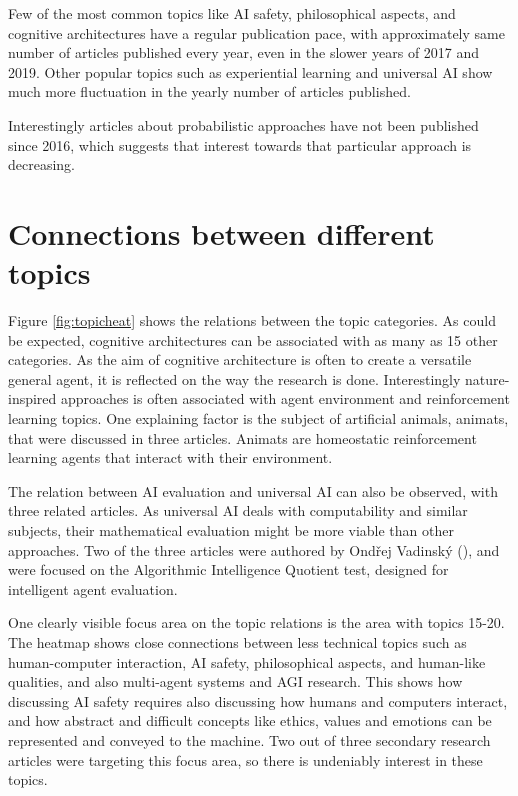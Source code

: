 \documentclass[utf8,english]{gradu3}
\begin{document}
Few of the most common topics like AI safety, philosophical aspects, and
cognitive architectures have a regular publication pace, with approximately same
number of articles published every year, even in the slower years of 2017 and
2019. Other popular topics such as experiential learning and universal AI show
much more fluctuation in the yearly number of articles published.

Interestingly articles about probabilistic approaches have not been published
since 2016, which suggests that interest towards that particular approach is
decreasing.


\section{Connections between different topics}

Figure \ref{fig:topicheat} shows the relations between the topic categories. As
could be expected, cognitive architectures can be associated with as many as 15
other categories. As the aim of cognitive architecture is often to create a
versatile general agent, it is reflected on the way the research is done.
Interestingly nature-inspired approaches is often associated with agent
environment and reinforcement learning topics. One explaining factor is the
subject of artificial animals, animats, that were discussed in three articles.
Animats are homeostatic reinforcement learning agents that interact with their
environment. 

The relation between AI evaluation and universal AI can also be observed, with
three related articles. As universal AI deals with computability and similar
subjects, their mathematical evaluation might be more viable than other
approaches. Two of the three articles were authored by Ond\v rej
Vadinsk\'y (\cite*{vadinsky2018lessons,vadinsky2018sema}), and were focused on the
Algorithmic Intelligence Quotient test, designed for intelligent agent
evaluation.

One clearly visible focus area on the topic relations is the area with topics
15-20. The heatmap shows close connections between less technical topics such as
human-computer interaction, AI safety, philosophical aspects, and human-like
qualities, and also multi-agent systems and AGI research. This shows how
discussing AI safety requires also discussing how humans and computers interact,
and how abstract and difficult concepts like ethics, values and emotions can be
represented and conveyed to the machine. Two out of three secondary research
articles were targeting this focus area, so there is undeniably interest in
these topics.
\end{document}
